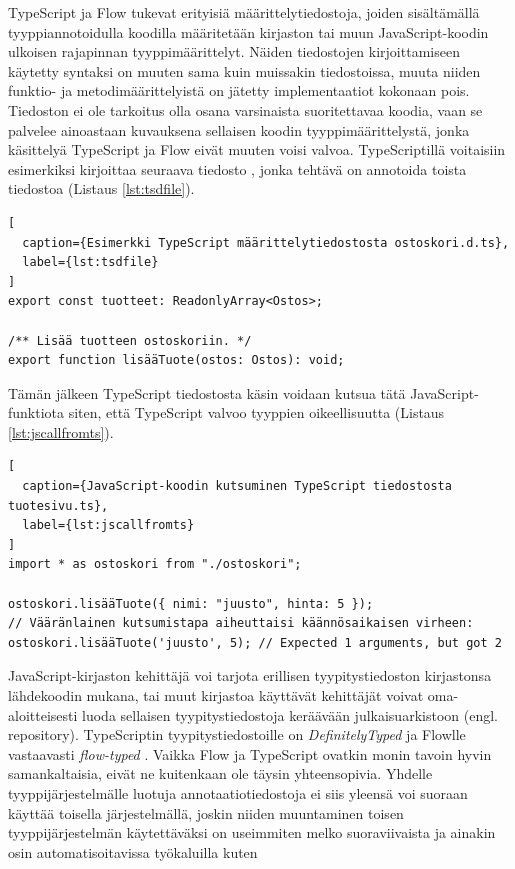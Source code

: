 TypeScript ja Flow tukevat erityisiä määrittelytiedostoja, joiden sisältämällä
tyyppiannotoidulla koodilla määritetään kirjaston tai muun JavaScript-koodin
ulkoisen rajapinnan tyyppimäärittelyt. Näiden tiedostojen kirjoittamiseen
käytetty syntaksi on muuten sama kuin muissakin tiedostoissa, muuta niiden funktio- ja
metodimäärittelyistä on jätetty implementaatiot kokonaan pois. Tiedoston ei
ole tarkoitus olla osana varsinaista suoritettavaa koodia, vaan se palvelee
ainoastaan kuvauksena sellaisen koodin tyyppimäärittelystä, jonka käsittelyä
TypeScript ja Flow eivät muuten voisi valvoa. TypeScriptillä voitaisiin
esimerkiksi kirjoittaa seuraava tiedosto , jonka
tehtävä on annotoida toista tiedostoa  (Listaus \ref{lst:tsdfile}).
\begin{lstlisting}[
  caption={Esimerkki TypeScript määrittelytiedostosta ostoskori.d.ts},
  label={lst:tsdfile}
]
export const tuotteet: ReadonlyArray<Ostos>;

/** Lisää tuotteen ostoskoriin. */
export function lisääTuote(ostos: Ostos): void;
\end{lstlisting}
Tämän jälkeen TypeScript tiedostosta käsin voidaan kutsua tätä
JavaScript-funktiota siten, että TypeScript valvoo
tyyppien oikeellisuutta (Listaus \ref{lst:jscallfromts}).
\begin{lstlisting}[
  caption={JavaScript-koodin kutsuminen TypeScript tiedostosta tuotesivu.ts},
  label={lst:jscallfromts}
]
import * as ostoskori from "./ostoskori";

ostoskori.lisääTuote({ nimi: "juusto", hinta: 5 });
// Vääränlainen kutsumistapa aiheuttaisi käännösaikaisen virheen:
ostoskori.lisääTuote('juusto', 5); // Expected 1 arguments, but got 2
\end{lstlisting}
JavaScript-kirjaston kehittäjä voi tarjota erillisen tyypitystiedoston
kirjastonsa lähdekoodin mukana, tai muut kirjastoa käyttävät kehittäjät
voivat oma-aloitteisesti luoda sellaisen tyypitystiedostoja keräävään
julkaisuarkistoon (engl. repository).
TypeScriptin tyy\-pi\-tys\-tie\-dos\-toil\-le
on \textit{DefinitelyTyped} \cite{DefinitelyTyped} ja Flowlle
vastaavasti \textit{flow-typed} \cite{FlowTyped}. Vaikka Flow ja TypeScript
ovatkin monin tavoin hyvin samankaltaisia, eivät ne kuitenkaan ole täysin
yhteensopivia. Yhdelle tyyppijärjestelmälle luotuja annotaatiotiedostoja
ei siis yleensä voi suoraan käyttää toisella järjestelmällä, joskin niiden
muuntaminen toisen tyyppijärjestelmän käytettäväksi on useimmiten melko
suoraviivaista ja ainakin osin automatisoitavissa työkaluilla kuten
